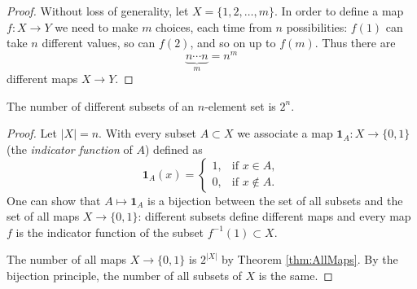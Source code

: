 \begin{page}
\setcounter{section}{2}
\setcounter{subsection}{2}
\setcounter{dfn}{2}
\label{portion:27}

\begin{proof}
Without loss of generality, let $X = \{1, 2, \ldots, m\}$.
In order to define a map $f \colon X \to Y$ we need to make $m$ choices, each time from $n$ possibilities:
$f(1)$ can take $n$ different values, so can $f(2)$, and so on up to $f(m)$.
Thus there are
\[
\underbrace{n \cdots n}_{m} = n^m
\]
different maps $X \to Y$.
\end{proof}


\end{page}

\begin{page}
\setcounter{section}{2}
\setcounter{subsection}{2}
\setcounter{dfn}{3}
\label{portion:29}

\begin{thm}
\label{thm:AllSubsets}
The number of different subsets of an $n$-element set is $2^n$.
\end{thm}

\end{page}

\begin{page}
\setcounter{section}{2}
\setcounter{subsection}{2}
\setcounter{dfn}{3}
\label{portion:30}

\begin{proof}
Let $|X| = n$. With every subset $A \subset X$ we associate a map $\mathbf{1}_A \colon X \to \{0,1\}$ (the \emph{indicator function} of $A$) defined as
\[
\mathbf{1}_A(x) =
\begin{cases}
1, &\text{if } x \in A,\\
0, &\text{if } x \notin A.
\end{cases}
\]
One can show that $A \mapsto \mathbf{1}_A$ is a bijection between the set of all subsets and the set of all maps $X \to \{0,1\}$:
different subsets define different maps and every map $f$ is the indicator function of the subset $f^{-1}(1) \subset X$.

The number of all maps $X \to \{0,1\}$ is $2^{|X|}$ by Theorem \ref{thm:AllMaps}.
By the bijection principle, the number of all subsets of $X$ is the same.
\end{proof}


\end{page}

